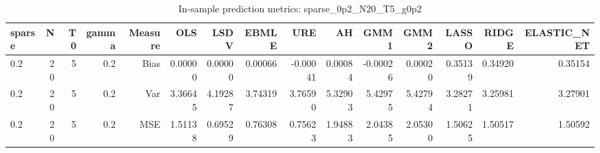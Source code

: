\begin{table}[!htbp]\centering
\caption{In-sample prediction metrics: sparse_0p2_N20_T5_g0p2}
\label{tab:table2_sparse_0p2_N20_T5_g0p2}
\begin{tabular}{lrrrrrrrrrrrrrr}
\hline
sparse & N & T0 & gamma & Measure & OLS & LSDV & EBMLE & URE & AH & GMM1 & GMM2 & LASSO & RIDGE & ELASTIC_NET \\
\hline
0.2 & 20 & 5 & 0.2 & Bias & 0.00000 & 0.00000 & 0.00066 & -0.00041 & 0.00084 & -0.00026 & 0.00020 & 0.35139 & 0.34920 & 0.35154 \\
0.2 & 20 & 5 & 0.2 & Var & 3.36645 & 4.19287 & 3.74319 & 3.76590 & 5.32903 & 5.42975 & 5.42794 & 3.28271 & 3.25981 & 3.27901 \\
0.2 & 20 & 5 & 0.2 & MSE & 1.51138 & 0.69529 & 0.76308 & 0.75623 & 1.94883 & 2.04385 & 2.05300 & 1.50625 & 1.50517 & 1.50592 \\
\hline
\end{tabular}
\end{table}

